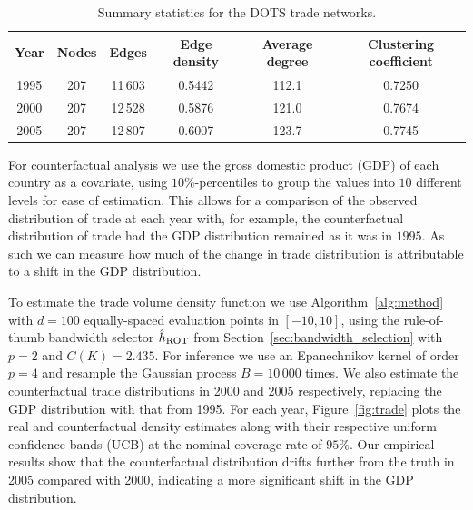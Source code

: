 \vspace{4mm}
\begin{table}[ht]
  \centering
  \begin{tabular}{|c|c|c|c|c|c|}
    \hline
    Year & Nodes & Edges & Edge density & Average degree
    & Clustering coefficient \\
    \hline
    1995 & 207 & 11\,603 & 0.5442 & 112.1 & 0.7250 \\
    2000 & 207 & 12\,528 & 0.5876 & 121.0 & 0.7674 \\
    2005 & 207 & 12\,807 & 0.6007 & 123.7 & 0.7745 \\
    \hline
  \end{tabular}
  \caption[Summary statistics for the DOTS trade networks]{
  Summary statistics for the DOTS trade networks.}
  \label{tab:trade_network_stats}
\end{table}

For counterfactual analysis we use the gross domestic product (GDP) of each
country as a covariate, using $10\%$-percentiles to group the values into $10$
different levels for ease of estimation. This allows for a comparison of the
observed distribution of trade at each year with, for example, the
counterfactual distribution of trade had the GDP distribution remained as it
was in $1995$. As such we can measure how much of the change in trade
distribution is attributable to a shift in the GDP distribution.

To estimate the trade volume density function we use Algorithm~\ref{alg:method}
with $d=100$ equally-spaced evaluation points in $[-10,10]$, using the
rule-of-thumb bandwidth selector $\hat h_{\operatorname{ROT}}$ from
Section~\ref{sec:bandwidth_selection} with $p=2$ and $C(K) = 2.435$. For
inference we use an Epanechnikov kernel of order $p=4$ and resample the
Gaussian process $B = 10\,000$ times. We also estimate the counterfactual trade
distributions in 2000 and 2005 respectively, replacing the GDP distribution
with that from 1995. For each year, Figure~\ref{fig:trade} plots the real and
counterfactual density estimates along with their respective uniform confidence
bands (UCB) at the nominal coverage rate of $95\%$. Our empirical results show
that the counterfactual distribution drifts further from the truth in 2005
compared with 2000, indicating a more significant shift in the GDP
distribution.

